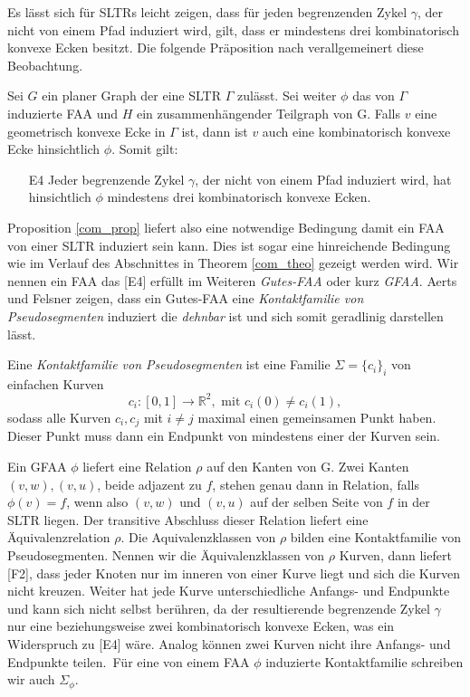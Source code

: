 Es lässt sich für SLTRs leicht zeigen, dass für jeden begrenzenden Zykel $\gamma$, der nicht von einem Pfad induziert wird, gilt, dass er mindestens drei kombinatorisch konvexe Ecken besitzt. Die folgende Präposition nach \cite[Prop 2.2, Prop 2.4]{af13} verallgemeinert diese Beobachtung.

\begin{proposition}\label{com_prop}
Sei $G$ ein planer Graph der eine SLTR $\Gamma$ zulässt. Sei weiter $\phi$ das von $\Gamma$ induzierte FAA und $H$ ein zusammenhängender Teilgraph von G. Falls $v$ eine geometrisch konvexe Ecke in $\Gamma$ ist, dann ist $v$ auch eine kombinatorisch konvexe Ecke hinsichtlich $\phi$. Somit gilt:
\begin{itemize}
\item [E4] Jeder begrenzende Zykel $\gamma$, der nicht von einem Pfad induziert wird, hat hinsichtlich $\phi$ mindestens drei kombinatorisch konvexe Ecken.
\end{itemize}

\end{proposition}

Proposition \ref{com_prop} liefert also eine notwendige Bedingung damit ein FAA von einer SLTR induziert sein kann. Dies ist sogar eine hinreichende Bedingung wie im Verlauf des Abschnittes in Theorem \ref{com_theo} gezeigt werden wird. Wir nennen ein FAA das [E4] erfüllt im Weiteren \textit{Gutes-FAA} oder kurz \textit{GFAA}. Aerts und Felsner zeigen, dass ein Gutes-FAA eine \textit{Kontaktfamilie von Pseudosegmenten} induziert die \textit{dehnbar} ist und sich somit geradlinig darstellen lässt.

\begin{definition}

Eine \textit{Kontaktfamilie von Pseudosegmenten} ist eine Familie $\Sigma = \{c_i\}_i$ von einfachen Kurven $$c_i:[0,1] \to \mathbb{R}^2, \text{ mit } c_i(0) \neq c_i(1),$$ sodass alle Kurven $c_i,c_j$ mit $i \neq j$ maximal einen gemeinsamen Punkt haben. Dieser Punkt muss dann ein Endpunkt von mindestens einer der Kurven sein.

\end{definition}

Ein GFAA $\phi$ liefert eine Relation $\rho$ auf den Kanten von G. Zwei Kanten $(v,w),(v,u)$, beide adjazent zu $f$, stehen genau dann in Relation, falls $\phi(v)=f$, wenn also $(v,w)$ und $(v,u)$ auf der selben Seite von $f$ in der SLTR liegen. Der transitive Abschluss dieser Relation liefert eine Äquivalenzrelation $\rho$. Die Aquivalenzklassen von $\rho$ bilden eine Kontaktfamilie von Pseudosegmenten. Nennen wir die Äquivalenzklassen von $\rho$ Kurven, dann liefert [F2], dass jeder Knoten nur im inneren von einer Kurve liegt und sich die Kurven nicht kreuzen. Weiter hat jede Kurve unterschiedliche Anfangs- und Endpunkte und kann sich nicht selbst berühren, da der resultierende begrenzende Zykel $\gamma$ nur eine beziehungsweise zwei kombinatorisch konvexe Ecken, was ein Widerspruch zu [E4] wäre. Analog können zwei Kurven nicht ihre Anfangs- und Endpunkte teilen.\
Für eine von einem FAA $\phi$ induzierte Kontaktfamilie schreiben wir auch $\Sigma_{\phi}$.

